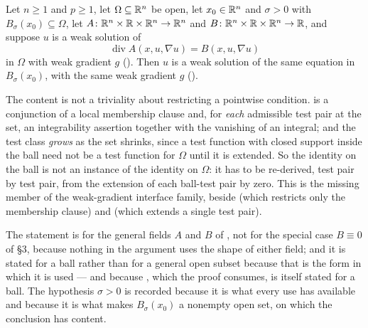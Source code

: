 \begin{lemma}
Let $n\ge1$ and $p\ge1$, let $\Omega\subseteq\mathbb{R}^n$ be open, let $x_0\in\mathbb{R}^n$ and
$\sigma>0$ with $B_\sigma(x_0)\subseteq\Omega$, let
$A\colon\mathbb{R}^n\times\mathbb{R}\times\mathbb{R}^n\to\mathbb{R}^n$ and
$B\colon\mathbb{R}^n\times\mathbb{R}\times\mathbb{R}^n\to\mathbb{R}$, and suppose $u$ is a weak solution of
\[
\operatorname{div}A(x,u,\nabla u)=B(x,u,\nabla u)
\]
in $\Omega$ with weak gradient $g$ ().  Then $u$ is a
weak solution of the same equation in $B_\sigma(x_0)$, with the same weak
gradient $g$ ().

The content is not a triviality about restricting a pointwise condition.
 is a conjunction of a local membership clause and, for
\emph{each} admissible test pair at the set, an integrability assertion together
with the vanishing of an integral; and the test class \emph{grows} as the set
shrinks, since a test function with closed support inside the ball need not be a
test function for $\Omega$ until it is extended.  So the identity on the ball is
not an instance of the identity on $\Omega$: it has to be re-derived, test pair
by test pair, from the extension of each ball-test pair by zero.  This is the
missing member of the weak-gradient interface family, beside
 (which restricts only the membership clause) and
 (which extends a single test pair).

The statement is for the general fields $A$ and $B$ of ,
not for the special case $B\equiv0$ of \S3, because nothing in the argument uses
the shape of either field; and it is stated for a ball rather than for a general
open subset because that is the form in which it is used --- and because
, which the proof consumes, is itself stated for
a ball.  The hypothesis $\sigma>0$ is recorded because it is what every use has available
and because it is what makes $B_\sigma(x_0)$ a nonempty open set, on which the
conclusion has content.
\end{lemma}
